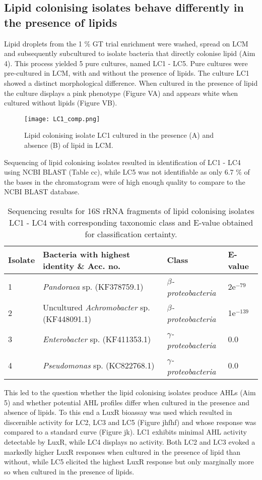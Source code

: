 \documentclass[11pt]{article}
\begin{document}
\subsection{Lipid colonising isolates behave differently in the presence of lipids}

Lipid droplets from the 1 \% GT trial enrichment were washed, spread on LCM and subsequently subcultured to isolate bacteria that directly colonise lipid (Aim 4). This process yielded 5 pure cultures, named LC1 - LC5.  Pure cultures were pre-cultured in LCM, with and without the presence of lipids. The culture LC1 showed a distinct morphological difference. When cultured in the presence of lipid the culture displays a pink phenotype (Figure VA) and appears white when cultured without lipids (Figure VB).

\begin{figure}
\texttt{[image: LC1\_comp.png]}
\caption{Lipid colonising isolate LC1 cultured in the presence (A) and absence (B) of lipid in LCM.}
\end{figure}

Sequencing of lipid colonising isolates resulted in identification of LC1 - LC4 using NCBI BLAST (Table cc), while LC5 was not identifiable as only 6.7 \% of the bases in the chromatogram were of high enough quality to compare to the NCBI BLAST database.
	
\begin{table}
\caption{Sequencing results for 16S rRNA fragments of lipid colonising isolates LC1 - LC4 with corresponding taxonomic class and E-value obtained for classification certainty.}
\begin{tabular}{ | l | p{7.8cm} | p{3cm} | l | }
\hline
Isolate & Bacteria with highest identity \& Acc. no. & Class & E-value \\
\hline
1 &  \emph{Pandoraea} sp. (KF378759.1) & \emph{$\beta$-proteobacteria} & 2e$^{-79}$ \\
\hline
2 & Uncultured \emph{Achromobacter} sp. (KF448091.1) & \emph{$\beta$-proteobacteria} & 1e$^{-139}$ \\
\hline
3 & \emph{Enterobacter} sp. (KF411353.1) & \emph{$\gamma$-proteobacteria} & 0.0 \\
\hline
4 & \emph{Pseudomonas} sp. (KC822768.1) & \emph{$\gamma$-proteobacteria} & 0.0 \\
\hline
\end{tabular}
\end{table}

This led to the question whether the lipid colonising isolates produce AHLs (Aim 5) and whether potential AHL profiles differ when cultured in the presence and absence of lipids. To this end a LuxR bioassay was used which resulted in discernible activity for LC2, LC3 and LC5 (Figure jhfhf) and whose response was compared to a standard curve (Figure jk). LC1 exhibits minimal AHL activity detectable by LuxR, while LC4 displays no activity. Both LC2 and LC3 evoked a markedly higher LuxR responses when cultured in the presence of lipid than without, while LC5 elicited the highest LuxR response but only marginally more so when cultured in the presence of lipids.
\end{document}
